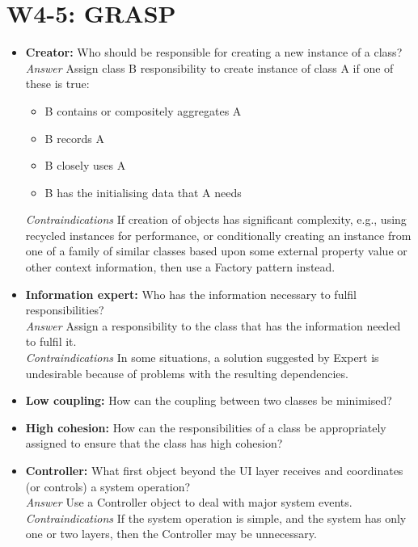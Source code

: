 \section{W4-5: GRASP}
\begin{itemize}
    \item \textbf{Creator:} Who should be responsible for creating a new instance of a class?\\
    \textit{Answer} Assign class B responsibility to create instance of class A if one of these is true:
    \begin{itemize}
        \item B contains or compositely aggregates A
        \item B records A
        \item B closely uses A
        \item B has the initialising data that A needs
    \end{itemize}
    \textit{Contraindications} If creation of objects has significant complexity, e.g., using recycled instances for performance, or conditionally creating an instance from one of a family of similar classes based upon some external property value or other context information, then use a Factory pattern instead.
    \item \textbf{Information expert:} Who has the information necessary to fulfil responsibilities?\\
    \textit{Answer} Assign a responsibility to the class that has the information needed to fulfil it.\\
    \textit{Contraindications} In some situations, a solution suggested by Expert is undesirable because of problems with the resulting dependencies.
    \item \textbf{Low coupling:} How can the coupling between two classes be minimised?\\
    \item \textbf{High cohesion:} How can the responsibilities of a class be appropriately assigned to ensure that the class has high cohesion?\\
    \item \textbf{Controller:} What first object beyond the UI layer receives and coordinates (or controls) a system operation?\\
    \textit{Answer} Use a Controller object to deal with major system events.\\
    \textit{Contraindications} If the system operation is simple, and the system has only one or two layers, then the Controller may be unnecessary.

\end{itemize}
